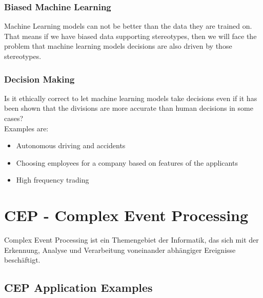 \subsubsection*{Biased Machine Learning}

Machine Learning models can not be better than the data they are trained on. That means if we have biased data supporting stereotypes, then we will face the problem that machine learning models decisions are also driven by those stereotypes.

\subsubsection*{Decision Making}

Is it ethically correct to let machine learning models take decisions even if it has been shown that the divisions are more accurate than human decisions in some cases?\\
Examples are:

\begin{itemize}
    \item Autonomous driving and accidents
    \item Choosing employees for a company based on features of the applicants
    \item High frequency trading
\end{itemize}


\section{CEP - Complex Event Processing}

Complex Event Processing ist ein Themengebiet der Informatik, das sich mit der Erkennung, Analyse und Verarbeitung voneinander abhängiger Ereignisse beschäftigt.

\subsection{CEP Application Examples}

